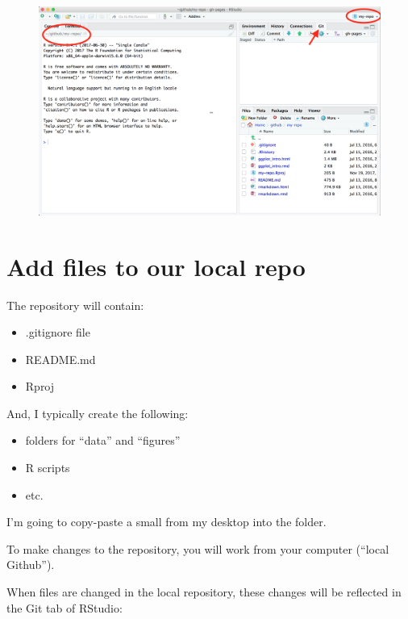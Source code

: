\documentclass[]{book}
\providecommand{\tightlist}{%
  \setlength{\itemsep}{0pt}\setlength{\parskip}{0pt}}
\theoremstyle{definition}
\theoremstyle{definition}
\theoremstyle{definition}
\theoremstyle{remark}
\begin{document}
\begin{figure}[htbp]
\centering
\includegraphics{img/RStudio_IDE_git.png}
\caption{}
\end{figure}

\section{Add files to our local repo}\label{add-files-to-our-local-repo}

The repository will contain:

\begin{itemize}
\tightlist
\item
  .gitignore file
\item
  README.md
\item
  Rproj
\end{itemize}

And, I typically create the following:

\begin{itemize}
\tightlist
\item
  folders for ``data'' and ``figures''\\
\item
  R scripts
\item
  etc.
\end{itemize}

I'm going to copy-paste a small from my desktop into the folder.

To make changes to the repository, you will work from your computer
(``local Github'').

When files are changed in the local repository, these changes will be
reflected in the Git tab of RStudio:
\end{document}
